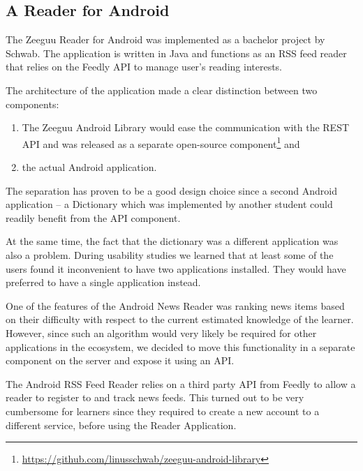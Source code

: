 \documentclass{sig-alternate-05-2015}
\begin{document}
\subsection {A Reader for Android}

The Zeeguu Reader for Android was implemented as a bachelor project by Schwab\cite{Schw16thesis}. The application is written in Java and functions as an RSS feed reader that relies on the Feedly API to manage user's reading interests.

The architecture of the application made a clear distinction between two components: 

\begin{enumerate}
	\item The Zeeguu Android Library would ease the communication with the REST API and was released as a separate open-source component\footnote{\url{https://github.com/linusschwab/zeeguu-android-library}} and 
	\item the actual Android  application. 
\end{enumerate}

The separation has proven to be a good design choice since a second Android application -- a Dictionary \cite{Gieh15a} which was implemented by another student could readily benefit from the API component.

At the same time, the fact that the dictionary was a different application was also a problem. During usability studies we learned that at least some of the users found it inconvenient to have two applications installed. They would have preferred to have a single application instead. 


One of the features of the Android News Reader was ranking news items based on their difficulty with respect to the current estimated knowledge of the learner. However, since such an algorithm would very likely be required for other applications in the ecosystem, we decided to move this functionality in a separate component on the server and expose it using an API. 


The Android RSS Feed Reader relies on a third party API from Feedly to allow a reader to register to and track news feeds. This turned out to be very cumbersome for learners since they required to create a new account to a different service, before using the Reader Application.
\end{document}
